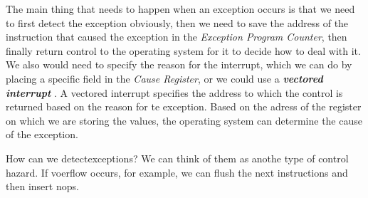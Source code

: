 \documentclass{article}
\begin{document}
The main thing that needs to happen when an exception occurs is that we need to first detect the 
exception obviously, then we need to save the address of the instruction that caused the exception in 
the \textit{Exception Program Counter}, then finally return control to the operating system for it to 
decide how to deal with it. We also would need to specify the reason for the interrupt, which we can do 
by placing a specific field in the \textit{Cause Register}, or we could use a 
\textbf{\textit{vectored interrupt }}. A vectored interrupt specifies the address to which the control is 
returned based on the reason for te exception. Based on the adress of the register on which we are 
storing the values, the operating system can determine the cause of the exception. 

How can we detectexceptions? We can think of them as anothe type of control hazard. If voerflow occurs,
for example, we can flush the next instructions and then insert nops.
\end{document}
